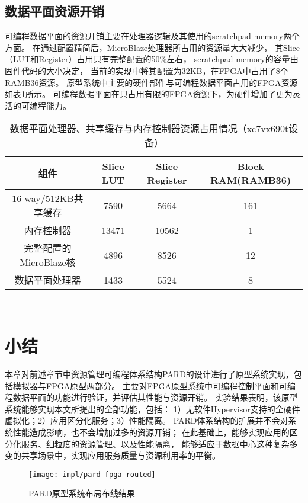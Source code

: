\subsection{数据平面资源开销}

可编程数据平面的资源开销主要在处理器逻辑及其使用的scratchpad memory两个方面。
在通过配置精简后，MicroBlaze处理器所占用的资源量大大减少，
其Slice（LUT和Register）占用只有完整配置的50\%左右，
scratchpad memory的容量由固件代码的大小决定，
当前的实现中将其配置为32KB，在FPGA中占用了8个RAMB36资源。
原型系统中主要的硬件部件与可编程数据平面占用的FPGA资源如表\ref{tab:pard-dp-resource}所示。
可编程数据平面在只占用有限的FPGA资源下，为硬件增加了更为灵活的可编程能力。

\begin{table}[htb]
  \centering
  \begin{minipage}[t]{0.9\linewidth}
  \caption{数据平面处理器、共享缓存与内存控制器资源占用情况（xc7vx690t设备）}
  \label{tab:pard-dp-resource}
    \begin{tabular*}{\linewidth}{cccc}
      \toprule[1.5pt]
      \textbf{组件} & \textbf{Slice LUT} & \textbf{Slice Register} & \textbf{Block RAM(RAMB36)} \\
      \midrule[1pt]
      16-way/512KB共享缓存    &  7590       &  5664            &  161               \\
      内存控制器              &  13471      &  10562           &  1                 \\
      完整配置的MicroBlaze核  &  4896       &  8526            &  12                \\
      \hline
      数据平面处理器          &  1433       &  5524            &  8                 \\
      \bottomrule[1.5pt]
    \end{tabular*}\\[2pt]
  \end{minipage}
\end{table}


\section{小结}

本章对前述章节中资源管理可编程体系结构PARD的设计进行了原型系统实现，包括模拟器与FPGA原型两部分。
主要对FPGA原型系统中可编程控制平面和可编程数据平面的功能进行验证，并评估其性能与资源开销。
实验结果表明，该原型系统能够实现本文所提出的全部功能，包括：
1）无软件Hypervisor支持的全硬件虚拟化；2）应用区分化服务；3）性能隔离。
PARD体系结构的扩展并不会对系统性能造成影响，也不会增加过多的资源开销；
在此基础上，能够实现应用的区分化服务、细粒度的资源管理、以及性能隔离，
能够适应于数据中心这种复杂多变的共享场景中，实现应用服务质量与资源利用率的平衡。


\begin{figure}[htb]
  \centering
  \texttt{[image: impl/pard-fpga-routed]}
  \caption{PARD原型系统布局布线结果}
  \label{fig:pard-fpga-routed}
\end{figure}
